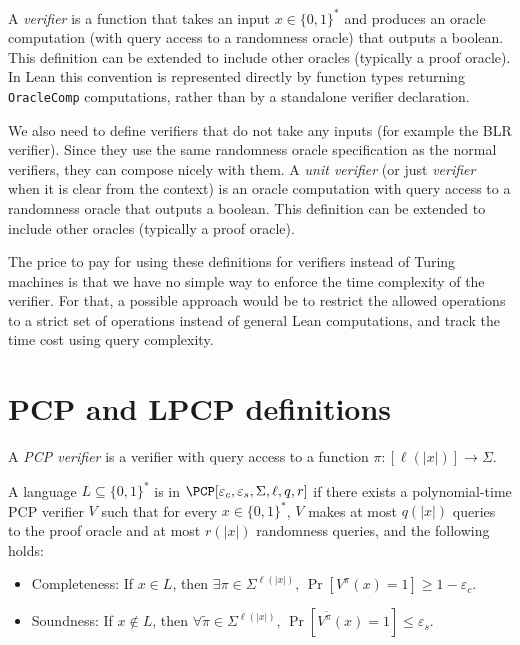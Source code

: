 A \emph{verifier} is a function that takes an input \(x \in \{0,1\}^*\) and produces an oracle computation
(with query access to a randomness oracle) that outputs a boolean. This definition can be extended to include
other oracles (typically a proof oracle). In Lean this convention is represented directly by function types returning
\texttt{OracleComp} computations, rather than by a standalone verifier declaration.

We also need to define verifiers that do not take any inputs (for example the BLR verifier).
Since they use the same randomness oracle specification as the normal verifiers, they can
compose nicely with them.
A \emph{unit verifier} (or just \emph{verifier} when it is clear from the context) is an oracle computation with query access to a randomness oracle that outputs a boolean.
This definition can be extended to include
other oracles (typically a proof oracle).

\begin{remark}
The price to pay for using these definitions for verifiers instead of Turing machines is that we have no simple way to enforce
the time complexity of the verifier. For that, a possible approach would be to restrict the allowed operations to a strict set
of operations instead of general Lean computations, and track the time cost using query complexity.
\end{remark}
\section{PCP and LPCP definitions}

\begin{definition}
\label{PCPVerifier}
\leanok
A \emph{PCP verifier} is a verifier with query access to a function $\pi : [\ell (|x|)] \to \Sigma$.
\end{definition}

\begin{definition}
\label{PCP}
\leanok
A language $L \subseteq \{0,1\}^*$ is in
$\PCP[\varepsilon_c, \varepsilon_s, \Sigma, \ell, q, r]$
if there exists a polynomial-time PCP verifier $V$
such that for every $x \in \{0,1\}^*$,
$V$ makes at most $q(|x|)$ queries to the proof oracle and
at most $r(|x|)$ randomness queries, and the following holds:
\begin{itemize}
  \item Completeness: If $x \in L$, then
  $\exists \pi \in \Sigma^{\ell(|x|)}, \,
  \Pr\left[V^\pi(x)=1 \right] \geq 1 - \varepsilon_c$.
  \item Soundness: If $x \notin L$, then
  $\forall \widetilde{\pi} \in \Sigma^{\ell(|x|)},\,
  \Pr\left[V^{\widetilde{\pi}}(x)=1 \right] \leq \varepsilon_s$.
\end{itemize}
\end{definition}

